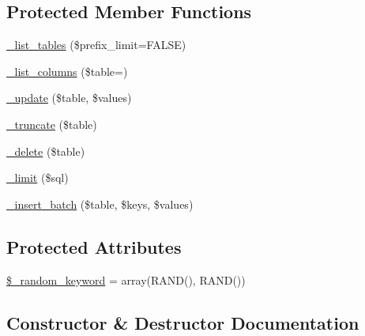 \subsection*{Protected Member Functions}
\begin{DoxyCompactItemize}
\item 
\mbox{\hyperlink{class_c_i___d_b__pdo__firebird__driver_a435c0f3ce54fe7daa178baa8532ebd54}{\+\_\+list\+\_\+tables}} (\$prefix\+\_\+limit=F\+A\+L\+SE)
\item 
\mbox{\hyperlink{class_c_i___d_b__pdo__firebird__driver_a7ccb7f9c301fe7f0a9db701254142b63}{\+\_\+list\+\_\+columns}} (\$table=\textquotesingle{}\textquotesingle{})
\item 
\mbox{\hyperlink{class_c_i___d_b__pdo__firebird__driver_a2540b03a93fa73ae74c10d0e16fc073e}{\+\_\+update}} (\$table, \$values)
\item 
\mbox{\hyperlink{class_c_i___d_b__pdo__firebird__driver_aa029600528fc1ce660a23ff4b4667f95}{\+\_\+truncate}} (\$table)
\item 
\mbox{\hyperlink{class_c_i___d_b__pdo__firebird__driver_a133ea8446ded52589bd22cc9163d0896}{\+\_\+delete}} (\$table)
\item 
\mbox{\hyperlink{class_c_i___d_b__pdo__firebird__driver_a3a02ea06541b8ecc25a33a61651562c8}{\+\_\+limit}} (\$sql)
\item 
\mbox{\hyperlink{class_c_i___d_b__pdo__firebird__driver_a1978e1358c812587a46e242630365099}{\+\_\+insert\+\_\+batch}} (\$table, \$keys, \$values)
\end{DoxyCompactItemize}
\subsection*{Protected Attributes}
\begin{DoxyCompactItemize}
\item 
\mbox{\hyperlink{class_c_i___d_b__pdo__firebird__driver_a10213aa6e05f6d924d3277bb1d2fea00}{\$\+\_\+random\+\_\+keyword}} = array(\textquotesingle{}R\+A\+ND()\textquotesingle{}, \textquotesingle{}R\+A\+ND()\textquotesingle{})
\end{DoxyCompactItemize}


\subsection{Constructor \& Destructor Documentation}
\mbox{\label{class_c_i___d_b__pdo__firebird__driver_a9162320adff1a1a4afd7f2372f753a3e}} 
